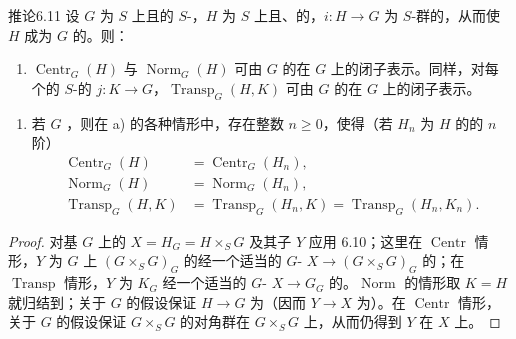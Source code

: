 \begin{SGAresult}{推论}{6.11}
设 $G$ 为 $S$ 上且的 $S$-，$H$ 为 $S$ 上且、的，$i:H\to G$ 为 $S$-群的，从而使 $H$ 成为 $G$ 的。则：
\begin{enumerate}
\item[a)] $\operatorname{Centr}_G(H)$ 与 $\operatorname{Norm}_G(H)$ 可由 $G$ 的在 $G$ 上的闭子表示。同样，对每个的 $S$-的 $j:K\to G$，$\operatorname{Transp}_G(H,K)$ 可由 $G$ 的在 $G$ 上的闭子表示。
\end{enumerate}
\begin{enumerate}
\item[b)] 若 $G$ ，则在 a) 的各种情形中，存在整数 $n\ge0$，使得（若 $H_n$ 为 $H$ 的的 $n$ 阶）
\[\begin{aligned}
\operatorname{Centr}_G(H)&=\operatorname{Centr}_G(H_n),\\
\operatorname{Norm}_G(H)&=\operatorname{Norm}_G(H_n),\\
\operatorname{Transp}_G(H,K)&=\operatorname{Transp}_G(H_n,K)=\operatorname{Transp}_G(H_n,K_n).
\end{aligned}\]
\end{enumerate}
\end{SGAresult}
\begin{proof}
对基 $G$ 上的 $X=H_G=H\times_S G$ 及其子 $Y$ 应用 6.10；这里在 $\operatorname{Centr}$ 情形，$Y$ 为 $G$ 上 $(G\times_S G)_G$ 的经一个适当的 $G$- $X\to(G\times_S G)_G$ 的；在 $\operatorname{Transp}$ 情形，$Y$ 为 $K_G$ 经一个适当的 $G$- $X\to G_G$ 的。$\operatorname{Norm}$ 的情形取 $K=H$ 就归结到；关于 $G$ 的假设保证 $H\to G$ 为（因而 $Y\to X$ 为）。在 $\operatorname{Centr}$ 情形，关于 $G$ 的假设保证 $G\times_S G$ 的对角群在 $G\times_S G$ 上，从而仍得到 $Y$ 在 $X$ 上。
\end{proof}
